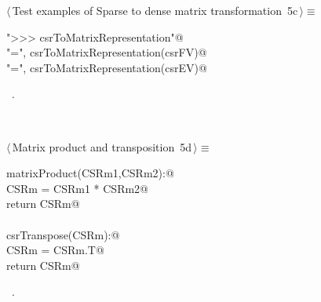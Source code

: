 \documentclass[11pt,oneside]{article}	%
\begin{document}
\begin{flushleft} \small
\begin{minipage}{\linewidth} \label{scrap11}
\protect{}$\langle\,$Test examples of Sparse to dense matrix transformation\nobreak\ {\footnotesize 5c}$\,\rangle\equiv$
\vspace{-1ex}
\begin{list}{}{} \item
\mbox{}\verb@print "\n>>> csrToMatrixRepresentation"@\\
\mbox{}\verb@print "\nFV =\n", csrToMatrixRepresentation(csrFV)@\\
\mbox{}\verb@print "\nEV =\n", csrToMatrixRepresentation(csrEV)@\\
\mbox{}\verb@@{\NWsep}
\end{list}
\vspace{-1ex}
\footnotesize\addtolength{\baselineskip}{-1ex}
\begin{list}{}{\setlength{\itemsep}{-\parsep}\setlength{\itemindent}{-\leftmargin}}
\item \NWtxtMacroRefIn\ .
\end{list}
\end{minipage}\\[4ex]
\end{flushleft}
\begin{flushleft} \small
\begin{minipage}{\linewidth} \label{scrap12}
\protect{}$\langle\,$Matrix product and transposition\nobreak\ {\footnotesize 5d}$\,\rangle\equiv$
\vspace{-1ex}
\begin{list}{}{} \item
\mbox{}\verb@def matrixProduct(CSRm1,CSRm2):@\\
\mbox{}\verb@    CSRm = CSRm1 * CSRm2@\\
\mbox{}\verb@    return CSRm@\\
\mbox{}\verb@@\\
\mbox{}\verb@def csrTranspose(CSRm):@\\
\mbox{}\verb@    CSRm = CSRm.T@\\
\mbox{}\verb@    return CSRm@\\
\mbox{}\verb@@{\NWsep}
\end{list}
\vspace{-1ex}
\footnotesize\addtolength{\baselineskip}{-1ex}
\begin{list}{}{\setlength{\itemsep}{-\parsep}\setlength{\itemindent}{-\leftmargin}}
\item \NWtxtMacroRefIn\ .
\end{list}
\end{minipage}\\[4ex]
\end{flushleft}
\end{document}
